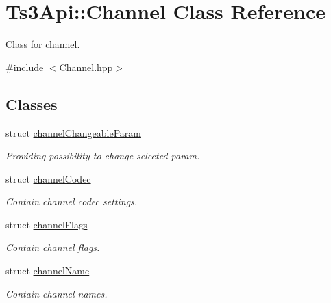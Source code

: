 \hypertarget{class_ts3_api_1_1_channel}{}\section{Ts3\+Api\+:\+:Channel Class Reference}
\label{class_ts3_api_1_1_channel}


Class for channel.  




{\ttfamily \#include $<$Channel.\+hpp$>$}

\subsection*{Classes}
\begin{DoxyCompactItemize}
\item 
struct \hyperlink{struct_ts3_api_1_1_channel_1_1channel_changeable_param}{channel\+Changeable\+Param}
\begin{DoxyCompactList}\small\item\em Providing possibility to change selected param. \end{DoxyCompactList}\item 
struct \hyperlink{struct_ts3_api_1_1_channel_1_1channel_codec}{channel\+Codec}
\begin{DoxyCompactList}\small\item\em Contain channel codec settings. \end{DoxyCompactList}\item 
struct \hyperlink{struct_ts3_api_1_1_channel_1_1channel_flags}{channel\+Flags}
\begin{DoxyCompactList}\small\item\em Contain channel flags. \end{DoxyCompactList}\item 
struct \hyperlink{struct_ts3_api_1_1_channel_1_1channel_name}{channel\+Name}
\begin{DoxyCompactList}\small\item\em Contain channel names. \end{DoxyCompactList}\end{DoxyCompactItemize}
